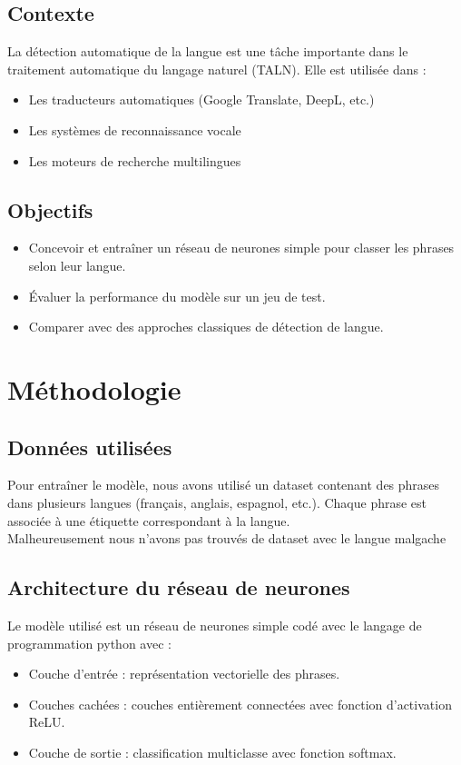 \documentclass[a4paper,12pt]{report}
\begin{document}
\section{Contexte}
La détection automatique de la langue est une tâche importante dans le traitement automatique du langage naturel (TALN).
Elle est utilisée dans :
\begin{itemize}
	\item Les traducteurs automatiques (Google Translate, DeepL, etc.)
	\item Les systèmes de reconnaissance vocale
	\item Les moteurs de recherche multilingues
\end{itemize}

\section{Objectifs}
\begin{itemize}
	\item Concevoir et entraîner un réseau de neurones simple pour classer les phrases selon leur langue.
	\item Évaluer la performance du modèle sur un jeu de test.
	\item Comparer avec des approches classiques de détection de langue.
\end{itemize}

\chapter*{Méthodologie}

\section{Données utilisées}
Pour entraîner le modèle, nous avons utilisé un dataset contenant des phrases dans plusieurs langues (français, anglais, espagnol, etc.).
Chaque phrase est associée à une étiquette correspondant à la langue.\\ Malheureusement nous n'avons pas trouvés de dataset avec le langue malgache

\section{Architecture du réseau de neurones}
Le modèle utilisé est un réseau de neurones simple codé avec le langage de programmation python avec :
\begin{itemize}
	\item Couche d'entrée : représentation vectorielle des phrases.
	\item Couches cachées : couches entièrement connectées avec fonction d'activation ReLU.
	\item Couche de sortie : classification multiclasse avec fonction softmax.
\end{itemize}
\end{document}
